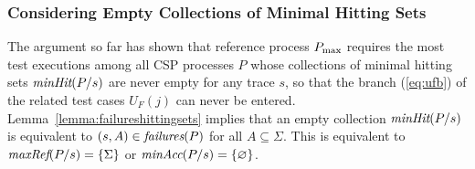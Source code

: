 \subsubsection*{Considering Empty Collections of Minimal Hitting Sets} 

The argument so far has shown that reference process $P_\text{max}$ requires the most test 
executions among all CSP processes $P$ whose collections of minimal hitting sets  
$\text{\it minHit}(P/s)$ are never empty for any trace $s$, so that the branch 
(\ref{eq:ufb}) of the related test cases $U_F(j)$ can never be entered.  
Lemma~\ref{lemma:failureshittingsets} implies that an empty collection 
$\text{\it minHit}(P/s)$
is equivalent to $(s,A)\in\text{\it failures}(P)$ for all $A\subseteq\Sigma$. This is equivalent to
$\text{\it maxRef}(P/s) = \{ \Sigma \}$ or $\text{\it minAcc}(P/s) = \{ \varnothing\}$.


